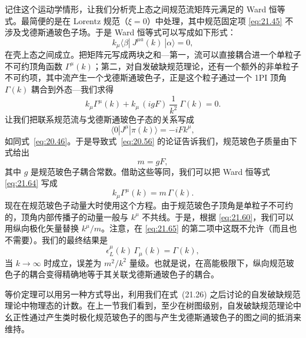 记住这个运动学情形，让我们分析壳上态之间规范流矩阵元满足的 Ward 恒等式。最简便的是在 Lorentz 规范（$\xi = 0$）中处理，其中规范固定项 \eqref{eq:21.45} 不涉及戈德斯通玻色子场。于是 Ward 恒等式可以写成如下形式：
\begin{equation}
  k_\mu\langle \beta|\ J^{\mu a}(k)\ |\alpha\rangle = 0 ,
  \label{eq:21.64}
\end{equation}
在壳上态之间成立。把矩阵元写成两块之和---第一，流可以直接耦合进一个单粒子不可约顶角函数 $\Gamma^\mu(k)$；第二，对自发破缺规范理论，还有一个额外的非单粒子不可约项，其中流产生一个戈德斯通玻色子，正是这个粒子通过一个 1PI 顶角 $\Gamma(k)$ 耦合到外态---我们求得
\begin{equation}
  k_\mu\Gamma^\mu(k) + k_\mu\,(igF)\ \frac{1}{k^2}\ \Gamma(k) = 0 .
  \label{eq:21.65}
\end{equation}
让我们把联系规范流与戈德斯通玻色子态的关系写成
\begin{equation}
  \langle 0|J^\mu|\pi(k)\rangle = -iF k^\mu ,
  \label{eq:21.62}
\end{equation}
如同式~\eqref{eq:20.46}。于是导致式~\eqref{eq:20.56} 的论证告诉我们，规范玻色子质量由下式给出
\begin{equation}
  m = gF ,
  \label{eq:21.63}
\end{equation}
其中 $g$ 是规范玻色子耦合常数。借助这些等同，我们可以把 Ward 恒等式 \eqref{eq:21.64} 写成
\begin{equation}
  k_\mu\Gamma^\mu(k) = m\,\Gamma(k) .
  \label{eq:21.66}
\end{equation}
现在在规范玻色子动量大时使用这个方程。由于规范玻色子顶角是单粒子不可约的，顶角内部传播子的动量一般与 $k^\mu$ 不共线。于是，根据 \eqref{eq:21.60}，我们可以用纵向极化矢量替换 $k^\mu/m$。注意，在 \eqref{eq:21.65} 的第二项中这既不允许（而且也不需要）。我们的最终结果是
\begin{equation}
  \epsilon^\mu_L(k)\,\Gamma_\mu(k) = \Gamma(k) ,
  \label{eq:21.67}
\end{equation}
当 $k\to\infty$ 时成立，误差为 $m^2/k^2$ 量级。也就是说，在高能极限下，纵向规范玻色子的耦合变得精确地等于其关联戈德斯通玻色子的耦合。

等价定理可以用另一种方式导出，利用我们在式~(21.26) 之后讨论的自发破缺规范理论中物理态的计数。在上一节我们看到，至少在树图级别，自发破缺规范理论中幺正性通过产生类时极化规范玻色子的图与产生戈德斯通玻色子的图之间的抵消来维持。

